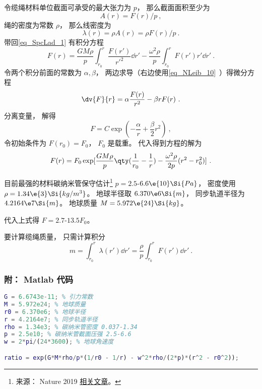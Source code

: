 令缆绳材料单位截面可承受的最大张力为 $p$， 那么截面面积至少为
\begin{equation}
A(r) = F(r)/p~,
\end{equation}
绳的密度为常数 $\rho$， 那么线密度为
\begin{equation}
\lambda(r) = \rho A(r) = \rho F(r)/p~.
\end{equation}
带回\autoref{eq_SpcLad_1} 有积分方程
\begin{equation}
F(r) = \frac{GM\rho}{p} \int_{r_0}^{r} \frac{F(r')}{r'^2} \dd{r'} - \frac{\omega^2\rho}{p}\int_{r_0}^r F(r') r' \dd{r'}~.
\end{equation}
令两个积分前面的常数为 $\alpha, \beta$， 两边求导（右边使用\autoref{eq_NLeib_10}~）得微分方程
\begin{equation}
\dv{F}{r} = \alpha \frac{F(r)}{r^2} - \beta r F(r)~.
\end{equation}
分离变量， 解得
\begin{equation}
F = C\exp(-\frac{\alpha}{r} + \frac{\beta}{2} r^2)~,
\end{equation}
令初始条件为 $F(r_0) = F_0$， $F_0$ 是载重。 代入得到方程的解为
\begin{equation}
F(r) = F_0 \exp[\frac{GM\rho}{p} \qty(\frac{1}{r_0} - \frac{1}{r}) - \frac{\omega^2\rho}{2p}(r^2 - r_0^2)]~.
\end{equation}

目前最强的材料碳纳米管保守估计\footnote{来源： Nature 2019 \href{https://www.nature.com/articles/s41467-019-10959-7}{相关文章}。} $p = 2.5$-$6.6\e{10} \Si{Pa}$， 密度使用 $\rho = 1.34\e{3} \Si{kg/m^3}$。 地球半径取 $6.370\e6\Si{m}$， 同步轨道半径为 $4.2164\e7 \Si{m}$。 地球质量 $M = 5.972\e{24} \Si{kg}$。

代入上式得 $F = 2.7$-$13.5 F_0$。

要计算缆绳质量， 只需计算积分
\begin{equation}
m = \int_{r_0}^{r} \lambda(r') \dd{r'} = \frac{\rho}{p} \int_{r_0}^{r} F(r') \dd{r'}~.
\end{equation}

\subsubsection{附： Matlab 代码}
\begin{lstlisting}[language=matlab]
G = 6.6743e-11; % 引力常数
M = 5.972e24; % 地球质量
r0 = 6.370e6; % 地球半径
r = 4.2164e7; % 同步轨道半径
rho = 1.34e3; % 碳纳米管密度 0.037-1.34
p = 2.5e10; % 碳纳米管截面压强 2.5-6.6
w = 2*pi/(24*3600); % 地球角速度

ratio = exp(G*M*rho/p*(1/r0 - 1/r) - w^2*rho/(2*p)*(r^2 - r0^2));
\end{lstlisting}

